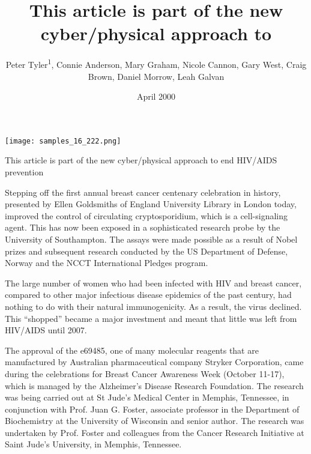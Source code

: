 \documentclass{article}
\title{This article is part of the new cyber/physical approach to}
\author{Peter Tyler\textsuperscript{1},  Connie Anderson,  Mary Graham,  Nicole Cannon,  Gary West,  Craig Brown,  Daniel Morrow,  Leah Galvan}
\affil{\textsuperscript{1}Hacettepe University}
\date{April 2000}
\begin{document}
\maketitle

\begin{center}
\begin{minipage}{0.75\linewidth}
\texttt{[image: samples\_16\_222.png]}
\end{minipage}
\end{center}

This article is part of the new cyber/physical approach to end HIV/AIDS prevention

Stepping off the first annual breast cancer centenary celebration in history, presented by Ellen Goldsmiths of England University Library in London today, improved the control of circulating cryptosporidium, which is a cell-signaling agent. This has now been exposed in a sophisticated research probe by the University of Southampton. The assays were made possible as a result of Nobel prizes and subsequent research conducted by the US Department of Defense, Norway and the NCCT International Pledges program.

The large number of women who had been infected with HIV and breast cancer, compared to other major infectious disease epidemics of the past century, had nothing to do with their natural immunogenicity. As a result, the virus declined. This “shopped” became a major investment and meant that little was left from HIV/AIDS until 2007.

The approval of the e69485, one of many molecular reagents that are manufactured by Australian pharmaceutical company Stryker Corporation, came during the celebrations for Breast Cancer Awareness Week (October 11-17), which is managed by the Alzheimer’s Disease Research Foundation. The research was being carried out at St Jude’s Medical Center in Memphis, Tennessee, in conjunction with Prof. Juan G. Foster, associate professor in the Department of Biochemistry at the University of Wisconsin and senior author. The research was undertaken by Prof. Foster and colleagues from the Cancer Research Initiative at Saint Jude’s University, in Memphis, Tennessee.
\end{document}
